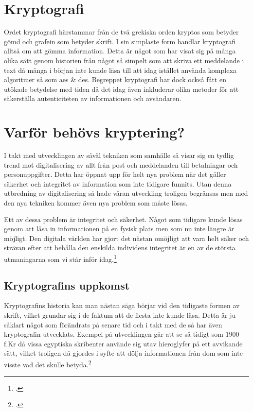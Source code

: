 
\section{Kryptografi} %
Ordet kryptografi härstammar från de två grekiska orden
kryptos som betyder gömd och grafein som betyder skrift.
I sin simplaste form handlar kryptografi alltså om att
gömma information. Detta är något som har visat sig på många
olika sätt genom historien från något så simpelt som att skriva
ett meddelande i text då många i början inte kunde läsa till
att idag istället använda komplexa algoritmer så som \acrshort{aes} \& \acrshort{des}.
Begreppet kryptografi har dock också fått en utökade betydelse
med tiden då det idag även inkluderar olika metoder för att
säkerställa autenticiteten av informationen och avsändaren.

\section{Varför behövs kryptering?} %
\label{sec:varfor-behovs-kryptering}
I takt med utvecklingen av såväl tekniken som samhälle så visar sig en tydlig trend mot digitalisering av allt från
post och meddelanden till betalningar och personuppgifter. Detta har öppnat upp för helt
nya problem när det gäller säkerhet och integritet av information som inte tidigare funnits. Utan denna utbredning av
digitalisering så hade våran utveckling troligen begränsas men med den nya tekniken kommer även nya problem
som måste lösas.

Ett av dessa problem är integritet och säkerhet. Något som tidigare kunde lösas genom att låsa in informationen på
en fysisk plats men som nu inte längre är möjligt. Den digitala världen har gjort det nästan
omöjligt att vara helt säker och strävan efter att behålla den enskilda individens integritet
är en av de största utmaningarna som vi står inför idag.\footcite{diffie2010privacy}

\subsection{Kryptografins uppkomst} %
Kryptografins historia kan man nästan säga börjar vid den
tidigaste formen av skrift, vilket grundar sig i de faktum att
de flesta inte kunde läsa. Detta är ju såklart något som förändrats
på senare tid och i takt med de så har även kryptografin utvecklats.
Exempel på utvecklingen går att se så tidigt som 1900 f.Kr då vissa egyptiska
skribenter använde sig utav hieroglyfer på ett avvikande sätt, vilket
troligen då gjordes i syfte att dölja informationen från dom som inte
visste vad det skulle betyda.\footcite{kryptografi-historia-1}

